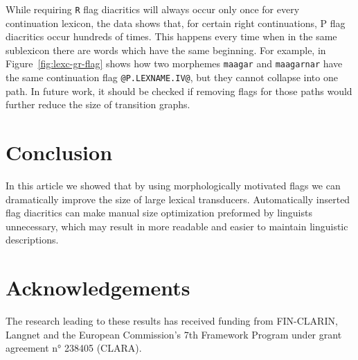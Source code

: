 \documentclass[10pt, a4paper]{article}
\begin{document}
While requiring {\tt R} flag diacritics will always occur only once
for every continuation lexicon, the data shows that, for
certain right continuations, P flag diacritics occur hundreds of
times. This happens every time when in the same sublexicon
there are words which have the same beginning. For example, in
Figure~\ref{fig:lexc-gr-flag} shows how two morphemes \texttt{maagar}
and \texttt{maagarnar} have the same continuation flag
\verb+@P.LEXNAME.IV@+, but they cannot collapse into one path. In future
work, it should be checked if removing flags for those paths would
further reduce the size of transition graphs.




\section{Conclusion}
\label{sec:conclusion}

In this article we showed that by using morphologically motivated
flags we can dramatically improve the size of large lexical transducers. Automatically
inserted flag diacritics can make manual size optimization preformed by
linguists unnecessary, which may result in more readable and easier
to maintain linguistic descriptions.

\section{Acknowledgements}
The research leading to these results has received funding from FIN-CLARIN, Langnet and the
European Commission's 7th Framework Program under grant agreement n° 238405 (CLARA).



\end{document}
